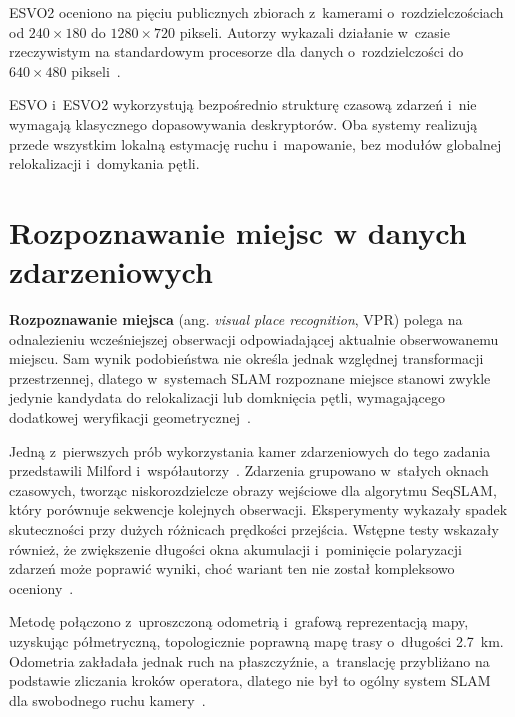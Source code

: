 ESVO2 oceniono na pięciu publicznych zbiorach z~kamerami o~rozdzielczościach od $240\times180$ do $1280\times720$ pikseli. Autorzy wykazali działanie w~czasie rzeczywistym na standardowym procesorze dla danych o~rozdzielczości do $640\times480$ pikseli~\cite{niu2025esvo2}.

ESVO i~ESVO2 wykorzystują bezpośrednio strukturę czasową zdarzeń i~nie wymagają klasycznego dopasowywania deskryptorów. Oba systemy realizują przede wszystkim lokalną estymację ruchu i~mapowanie, bez modułów globalnej relokalizacji i~domykania pętli.


\section{Rozpoznawanie miejsc w danych zdarzeniowych}
\label{sec:literatura_event_place}


\textbf{Rozpoznawanie miejsca} (ang. \textit{visual place recognition}, VPR) polega na odnalezieniu wcześniejszej obserwacji odpowiadającej aktualnie obserwowanemu miejscu. Sam wynik podobieństwa nie określa jednak względnej transformacji przestrzennej, dlatego w~systemach SLAM rozpoznane miejsce stanowi zwykle jedynie kandydata do relokalizacji lub domknięcia pętli, wymagającego dodatkowej weryfikacji geometrycznej~\cite{murartal2015orbslam}.

Jedną z~pierwszych prób wykorzystania kamer zdarzeniowych do tego zadania przedstawili Milford i~współautorzy~\cite{milford2015towards}. Zdarzenia grupowano w~stałych oknach czasowych, tworząc niskorozdzielcze obrazy wejściowe dla algorytmu SeqSLAM, który porównuje sekwencje kolejnych obserwacji. Eksperymenty wykazały spadek skuteczności przy dużych różnicach prędkości przejścia. Wstępne testy wskazały również, że zwiększenie długości okna akumulacji i~pominięcie polaryzacji zdarzeń może poprawić wyniki, choć wariant ten nie został kompleksowo oceniony~\cite{milford2015towards}.

Metodę połączono z~uproszczoną odometrią i~grafową reprezentacją mapy, uzyskując półmetryczną, topologicznie poprawną mapę trasy o~długości \SI{2.7}{\kilo\metre}. Odometria zakładała jednak ruch na płaszczyźnie, a~translację przybliżano na podstawie zliczania kroków operatora, dlatego nie był to ogólny system SLAM dla swobodnego ruchu kamery~\cite{milford2015towards}.


